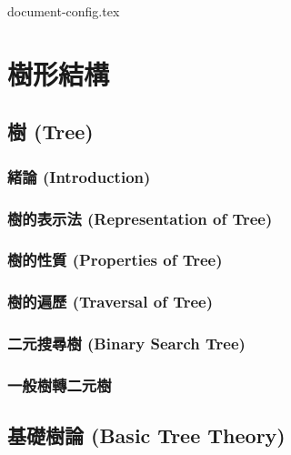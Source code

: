 \documentclass[12pt,a4paper,oneside]{report}
\begin{document}
\begin{CJK}{UTF8}{bkai}

{document-config.tex}
\setcounter{chapter}{7}

\fi


\chapter{樹形結構}\label{tree:chap}

\section{樹 (Tree)}

\subsection{緒論 (Introduction)}

\subsection{樹的表示法 (Representation of Tree)}

\subsection{樹的性質 (Properties of Tree)}

\subsection{樹的遍歷 (Traversal of Tree)}
\subsection{二元搜尋樹 (Binary Search Tree)}
\subsection{一般樹轉二元樹}

\section{基礎樹論 (Basic Tree Theory)}


\end{CJK}
\end{document}
